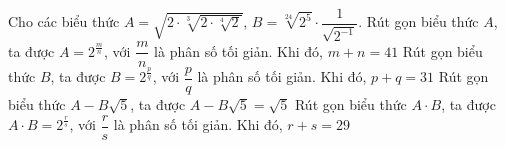 \begin{ex}%
	Cho  các biểu thức $A=\sqrt{2\cdot \sqrt[3]{2\cdot \sqrt[4]{2}}}$, $B=\sqrt[24]{2^5}\cdot \dfrac{1}{\sqrt{2^{-1}}}$.
	\choiceTF 
		{\True Rút gọn biểu thức $A$, ta được $A=2^{\tfrac{m}{n}}$, với $\dfrac{m}{n}$ là phân số tối giản. Khi  đó, $m+n=41$}
		{Rút gọn biểu thức $B$, ta được $B=2^{\tfrac{p}{q}}$, với $\dfrac{p}{q}$ là phân số tối giản. Khi  đó, $p+q=31$}
		{Rút gọn biểu thức $A-B\sqrt{5}$, ta được  $A-B\sqrt{5}=\sqrt{5}$}
		{\True Rút  gọn biểu thức $A\cdot B$, ta được $A\cdot B=2^{\tfrac{r}{s}}$, với $\dfrac{r}{s}$ là phân số tối giản. Khi đó, $r+s=29$}
\end{ex}

